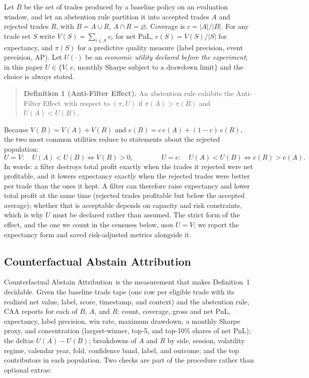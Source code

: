 \documentclass[10pt]{article}
\newcommand{\AF}{Anti-Filter Effect}
\newcommand{\CAA}{Counterfactual Abstain Attribution}
\begin{document}
Let $B$ be the set of trades produced by a baseline policy on an evaluation window, and let an abstention rule partition it into accepted trades $A$ and rejected trades $R$, with $B=A\cup R$, $A\cap R=\varnothing$. Coverage is $c=|A|/|B|$. For any trade set $S$ write $V(S)=\sum_{i\in S}v_i$ for net PnL, $e(S)=V(S)/|S|$ for expectancy, and $\pi(S)$ for a predictive quality measure (label precision, event precision, AP). Let $U(\cdot)$ be an \emph{economic utility declared before the experiment}; in this paper $U\in\{V,\,e,\,\text{monthly Sharpe subject to a drawdown limit}\}$ and the choice is always stated.

\begin{quote}
\textbf{Definition 1 (\AF).} An abstention rule exhibits the \AF\ with respect to $(\pi,U)$ if $\pi(A)>\pi(B)$ and $U(A)<U(B)$.
\end{quote}

Because $V(B)=V(A)+V(R)$ and $e(B)=c\,e(A)+(1-c)\,e(R)$, the two most common utilities reduce to statements about the rejected population:
\begin{equation}
U=V:\quad U(A)<U(B)\iff V(R)>0, \qquad\qquad U=e:\quad U(A)<U(B)\iff e(R)>e(A).
\label{eq:identity}
\end{equation}
In words: a filter destroys total profit exactly when the trades it rejected were net profitable, and it lowers expectancy exactly when the rejected trades were better per trade than the ones it kept. A filter can therefore raise expectancy and lower total profit at the same time (rejected trades profitable but below the accepted average); whether that is acceptable depends on capacity and risk constraints, which is why $U$ must be declared rather than assumed. The strict form of the effect, and the one we count in the censuses below, uses $U=V$; we report the expectancy form and saved risk-adjusted metrics alongside it.

\subsection{Counterfactual Abstain Attribution}

\CAA\ is the measurement that makes Definition~1 decidable. Given the baseline trade tape (one row per eligible trade with its realized net value, label, score, timestamp, and context) and the abstention rule, CAA reports for each of $B$, $A$, and $R$: count, coverage, gross and net PnL, expectancy, label precision, win rate, maximum drawdown, a monthly Sharpe proxy, and concentration (largest-winner, top-5, and top-10\% shares of net PnL); the deltas $U(A)-U(B)$; breakdowns of $A$ and $R$ by side, session, volatility regime, calendar year, fold, confidence band, label, and outcome; and the top contributors in each population. Two checks are part of the procedure rather than optional extras:
\end{document}
